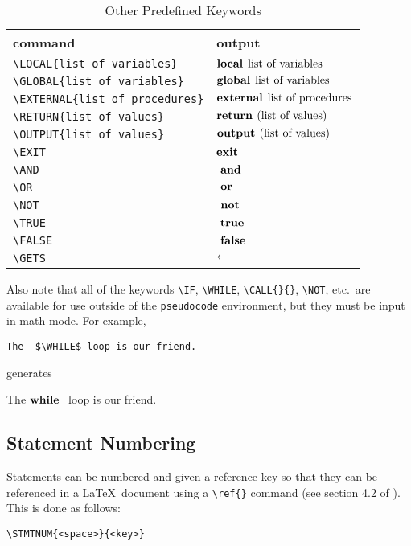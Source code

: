 \documentclass{article}
\newcommand{\keyword}[1]{\texttt{#1}}
\begin{document}
\begin{table}[h]
\caption{Other Predefined Keywords}
\label{other predefined keywords}
\begin{center}
\begin{tabular}{@{}ll@{}}
\hline
command & output\\
\hline
\verb+\LOCAL{list of variables}+&
$\mbox{\bfseries local}\hspace*{1ex}\mbox{list of variables}$\\
\verb+\GLOBAL{list of variables}+&
$\mbox{\bfseries global}\hspace*{1ex}\mbox{list of variables}$\\
\verb+\EXTERNAL{list of procedures}+&
$\mbox{\bfseries external}\hspace*{1ex}\mbox{list of procedures}$\\
\verb+\RETURN{list of values}+&
$\RETURN{\mbox{list of values}}$\\
\verb+\OUTPUT{list of values}+&
$\mbox{\bfseries output }(\mbox{list of values})$\\
\verb+\EXIT+&
$\mbox{\bfseries exit }$\\
\verb+\AND+&
$\mbox{ \bfseries and }$\\
\verb+\OR+&
$\mbox{ \bfseries or }$\\
\verb+\NOT+&
$\mbox{ \bfseries not }$\\
\verb+\TRUE+&
$\mbox{ \bfseries true }$\\
\verb+\FALSE+&
$\mbox{ \bfseries false }$\\
\verb+\GETS+&
$\leftarrow$\\
\hline
\end{tabular}
\end{center}
\end{table}

Also note 
that all of the keywords 
\verb+\IF+, \verb+\WHILE+, \verb+\CALL{}{}+, \verb+\NOT+, etc.\
are available for
use outside of the \keyword{pseudocode} environment, but they must
be input in math mode. For example,
\begin{center}
\verb+The  $\WHILE$ loop is our friend.+
\end{center}
generates
\begin{center}
The  $\mbox{\bfseries while }$ loop is our friend.
\end{center}


\subsection{Statement Numbering}

Statements can be numbered and given a reference key so that
they can be referenced in a \LaTeX\ document using a \verb+\ref{}+ command
(see section 4.2 of \cite{lamport}).
This is done as follows:

\begin{verbatim}
\STMTNUM{<space>}{<key>}
\end{verbatim}
\end{document}
